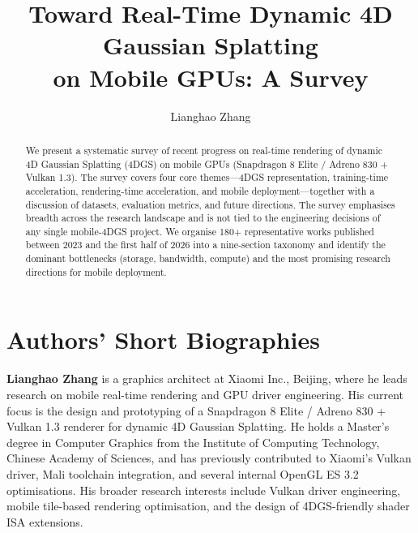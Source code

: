 \documentclass[acmlarge,sigconf,nonacm,review=false,letterpaper]{acmart}
\title{Toward Real-Time Dynamic 4D Gaussian Splatting\\
  on Mobile GPUs: A Survey}
\author{Lianghao Zhang}
\affiliation{%
  \institution{Xiaomi Inc., Graphics Architecture Department}
  \city{Beijing}
  \country{China}}
\begin{document}
\begin{abstract}
We present a systematic survey of recent progress on real-time rendering
of dynamic 4D Gaussian Splatting (4DGS) on mobile GPUs
(Snapdragon 8 Elite / Adreno 830 + Vulkan 1.3). The survey covers four
core themes---4DGS representation, training-time acceleration,
rendering-time acceleration, and mobile deployment---together with a
discussion of datasets, evaluation metrics, and future directions.
The survey emphasises breadth across the research landscape
and is not tied to the engineering decisions of any single
mobile-4DGS project. We organise 180+ representative works published
between 2023 and the first half of 2026 into a nine-section
taxonomy and identify the dominant bottlenecks (storage,
bandwidth, compute) and the most promising research
directions for mobile deployment.
\end{abstract}

\maketitle














\section*{Authors' Short Biographies}
\textbf{Lianghao Zhang} is a graphics architect at Xiaomi Inc.,
Beijing, where he leads research on mobile real-time rendering and
GPU driver engineering. His current focus is the design and
prototyping of a Snapdragon 8 Elite / Adreno 830 + Vulkan 1.3
renderer for dynamic 4D Gaussian Splatting. He holds a Master's
degree in Computer Graphics from the Institute of Computing
Technology, Chinese Academy of Sciences, and has previously
contributed to Xiaomi's Vulkan driver, Mali toolchain integration,
and several internal OpenGL ES 3.2 optimisations. His broader research interests include Vulkan driver
engineering, mobile tile-based rendering optimisation, and
the design of 4DGS-friendly shader ISA extensions.
\end{document}
